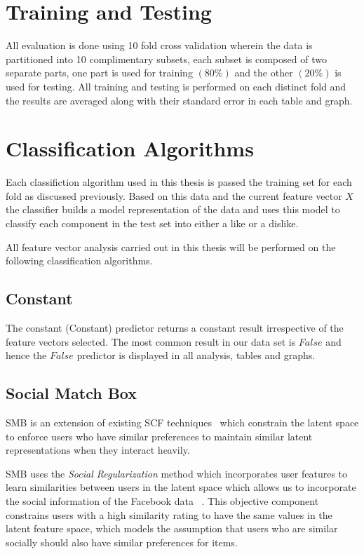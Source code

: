 \section{Training and Testing}
\label{sec:tt}

All evaluation is done using 10 fold cross validation wherein the data is partitioned into 10 complimentary subsets, each 
subset is composed of two separate parts, one part is used for training $(80\%)$ and the other $(20\%)$ is used for testing. 
All training and testing is performed on each distinct fold and the results are averaged along with their standard error in each
table and graph.

\section{Classification Algorithms}
\label{sec:meth}

Each classifiction algorithm used in this thesis is passed the training set for each fold as discussed previously. Based on this 
data and the current feature vector $X$ the classifier builds a model representation of the data and uses this model to classify 
each component in the test set into either a like or a dislike.

All feature vector analysis carried out in this thesis will be performed on the following classification algorithms.

\subsection{Constant}
\label{sec:const}

The constant (Constant) predictor returns a constant result irrespective of the feature vectors selected. The most common result 
in our data set is $False$ and hence the $False$ predictor is displayed in all analysis, tables and graphs.

\subsection{Social Match Box}
\label{sec:sr}

SMB is an extension of existing SCF techniques~\cite{lla,socinf} which constrain the latent space to enforce users 
who have similar preferences to maintain similar latent representations when they interact heavily.

SMB uses the \emph{Social Regularization} method which incorporates user features to learn
similarities between users in the latent space which allows us to incorporate the social information of the Facebook data ~\cite{joseph}.
This objective component constrains users with a high similarity rating to have the same values in the latent feature space, which
models the assumption that users who are similar socially should also have similar preferences for items.

